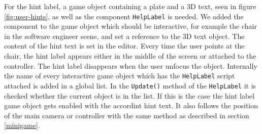 For the hint label, a game object containing a plate and a 3D text, seen in figure \ref{fig:user-hints}, as well as the component \texttt{HelpLabel} is needed. We added the component to the game object which should be interactive, for example the chair in the software engineer scene, and set a reference to the 3D text object. The content of the hint text is set in the editor. Every time the user points at the chair, the hint label appears either in the middle of the screen or attached to the controller. The hint label disappears when the user unfocus the object. Internally the name of every interactive game object which has the \texttt{HelpLabel} script attached is added in a global list. In the \texttt{Update()} method of the \texttt{HelpLabel} it is checked whether the current object is in the list. If this is the case the hint label game object gets enabled with the accordint hint text. It also follows the position of  the main camera or controller with the same method as described in section \ref{minigame}.